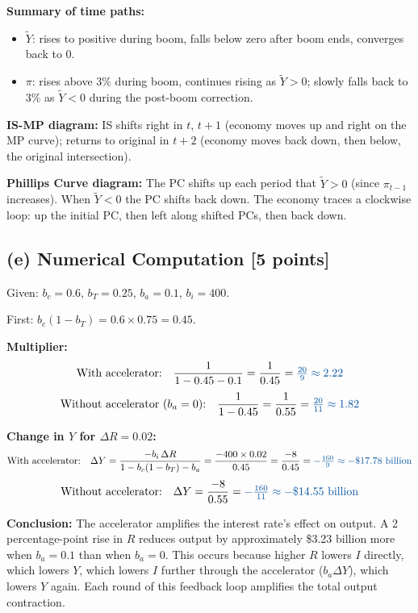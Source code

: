 \documentclass[letterpaper,12pt]{article}
\begin{document}
\noindent\textbf{Summary of time paths:}
\begin{itemize}
  \item $\widetilde{Y}$: rises to positive during boom, falls below zero after boom ends, converges back to 0.
  \item $\pi$: rises above 3\% during boom, continues rising as $\widetilde{Y}>0$; slowly falls back to 3\% as $\widetilde{Y}<0$ during the post-boom correction.
\end{itemize}

\noindent\textbf{IS-MP diagram:} IS shifts right in $t$, $t+1$ (economy moves up and right on the MP curve); returns to original in $t+2$ (economy moves back down, then below, the original intersection).

\noindent\textbf{Phillips Curve diagram:} The PC shifts up each period that $\widetilde{Y}>0$ (since $\pi_{t-1}$ increases). When $\widetilde{Y}<0$ the PC shifts back down. The economy traces a clockwise loop: up the initial PC, then left along shifted PCs, then back down.

\subsection*{(e) Numerical Computation [5 points]}

Given: $b_c = 0.6$, $b_T = 0.25$, $b_a = 0.1$, $b_i = 400$.

First: $b_c(1-b_T) = 0.6 \times 0.75 = 0.45$.

\textbf{Multiplier:}
\[
\text{With accelerator:}\quad \frac{1}{1-0.45-0.1} = \frac{1}{0.45} = \textcolor{sol}{\tfrac{20}{9} \approx 2.22}
\]
\[
\text{Without accelerator ($b_a=0$):}\quad \frac{1}{1-0.45} = \frac{1}{0.55} = \textcolor{sol}{\tfrac{20}{11} \approx 1.82}
\]

\textbf{Change in $Y$ for $\Delta R = 0.02$:}
\[
\text{With accelerator:}\quad \Delta Y = \frac{-b_i\,\Delta R}{1-b_c(1-b_T)-b_a} = \frac{-400 \times 0.02}{0.45} = \frac{-8}{0.45} = \textcolor{sol}{-\tfrac{160}{9} \approx -\$17.78\text{ billion}}
\]
\[
\text{Without accelerator:}\quad \Delta Y = \frac{-8}{0.55} = \textcolor{sol}{-\tfrac{160}{11} \approx -\$14.55\text{ billion}}
\]

\textbf{Conclusion:} The accelerator amplifies the interest rate's effect on output. A 2 percentage-point rise in $R$ reduces output by approximately \$3.23 billion more when $b_a = 0.1$ than when $b_a = 0$. This occurs because higher $R$ lowers $I$ directly, which lowers $Y$, which lowers $I$ further through the accelerator ($b_a \Delta Y$), which lowers $Y$ again. Each round of this feedback loop amplifies the total output contraction.
\end{document}
